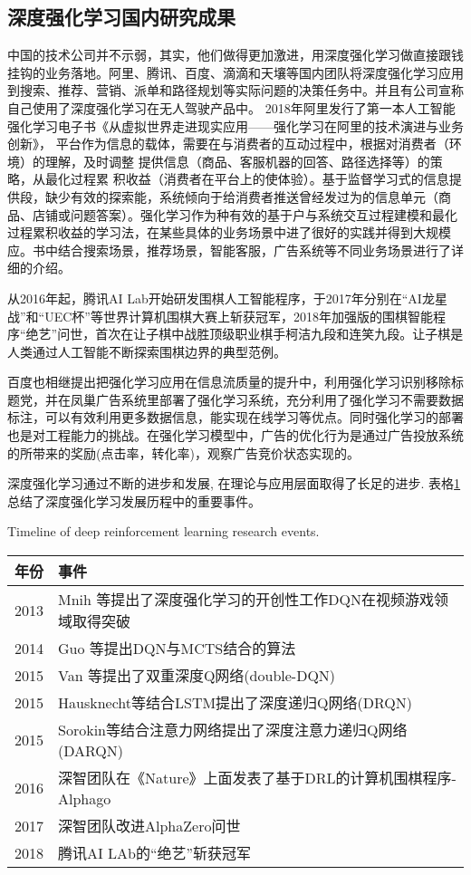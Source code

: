 \subsection{深度强化学习国内研究成果}
中国的技术公司并不示弱，其实，他们做得更加激进，用深度强化学习做直接跟钱挂钩的业务落地。阿里、腾讯、百度、滴滴和天壤等国内团队将深度强化学习应用到搜索、推荐、营销、派单和路径规划等实际问题的决策任务中。并且有公司宣称自己使用了深度强化学习在无人驾驶产品中。
2018年阿里发行了第一本人工智能强化学习电子书\raisebox{0.3mm}{----}《从虚拟世界走进现实应用——强化学习在阿里的技术演进与业务创新》， 平台作为信息的载体，需要在与消费者的互动过程中，根据对消费者（环境）的理解，及时调整 提供信息（商品、客服机器的回答、路径选择等）的策略，从最化过程累 积收益（消费者在平台上的使体验）。基于监督学习式的信息提供段，缺少有效的探索能，系统倾向于给消费者推送曾经发过为的信息单元（商品、店铺或问题答案）。强化学习作为种有效的基于户与系统交互过程建模和最化过程累积收益的学习法，在某些具体的业务场景中进了很好的实践并得到大规模应。书中结合搜索场景，推荐场景，智能客服，广告系统等不同业务场景进行了详细的介绍。

从2016年起，腾讯AI Lab开始研发围棋人工智能程序，于2017年分别在“AI龙星战”和“UEC杯”等世界计算机围棋大赛上斩获冠军，2018年加强版的围棋智能程序“绝艺”问世，首次在让子棋中战胜顶级职业棋手柯洁九段和连笑九段。让子棋是人类通过人工智能不断探索围棋边界的典型范例。

百度也相继提出把强化学习应用在信息流质量的提升中，利用强化学习识别移除标题党，并在凤巢广告系统里部署了强化学习系统，充分利用了强化学习不需要数据标注，可以有效利用更多数据信息，能实现在线学习等优点。同时强化学习的部署也是对工程能力的挑战。在强化学习模型中，广告的优化行为是通过广告投放系统的所带来的奖励(点击率，转化率)，观察广告竞价状态实现的。

深度强化学习通过不断的进步和发展, 在理论与应用层面取得了长足的进步. 表格\ref{tab:1}总结了深度强化学习发展历程中的重要事件。
\begin{table}[!hpb]
	\centering
	{Timeline of deep reinforcement learning research events.}
	\label{tab:1}
	\begin{tabular}{ll}
		年份 & 事件 \\ \midrule
		2013 & Mnih 等提出了深度强化学习的开创性工作DQN在视频游戏领域取得突破 \\
		2014& Guo 等提出DQN与MCTS结合的算法 \\
		2015 &Van 等提出了双重深度Q网络(double-DQN) \\
		2015&Hausknecht等结合LSTM提出了深度递归Q网络(DRQN)\\
		2015&Sorokin等结合注意力网络提出了深度注意力递归Q网络(DARQN)\\
		2016&深智团队在《Nature》上面发表了基于DRL的计算机围棋程序-Alphago\\
		2017&深智团队改进AlphaZero问世\\
		2018&腾讯AI LAb的“绝艺”斩获冠军\\
		 \bottomrule
	\end{tabular}
\end{table}
